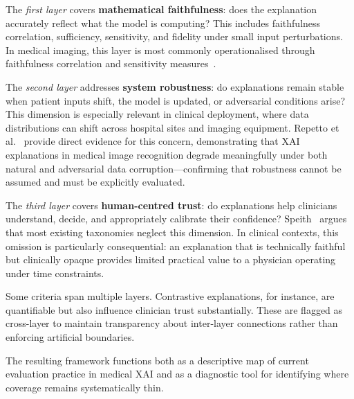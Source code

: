 The \emph{first layer} covers \textbf{mathematical faithfulness}: does
the explanation accurately reflect what the model is computing? This includes
faithfulness correlation, sufficiency, sensitivity, and fidelity under small
input perturbations. In medical imaging, this layer is most commonly
operationalised through faithfulness correlation and sensitivity
measures~\cite{kadir2023evaluation, jin2023guidelines}.

The \emph{second layer} addresses \textbf{system robustness}: do
explanations remain stable when patient inputs shift, the model is updated, or
adversarial conditions arise? This dimension is especially relevant in
clinical deployment, where data distributions can shift across hospital
sites and imaging equipment. Repetto et al.~\cite{Repetto2025EvaluatingTR}
provide direct evidence for this concern, demonstrating that XAI explanations in
medical image recognition degrade meaningfully under both natural and
adversarial data corruption---confirming that robustness cannot be assumed
and must be explicitly evaluated.

The \emph{third layer} covers \textbf{human-centred trust}: do
explanations help clinicians understand, decide, and appropriately calibrate
their confidence? Speith~\cite{speith2022review} argues that most
existing taxonomies neglect this dimension. In clinical contexts,
this omission is particularly consequential: an explanation that is
technically faithful but clinically opaque provides limited practical value
to a physician operating under time constraints.

Some criteria span multiple layers. Contrastive explanations, for instance,
are quantifiable but also influence clinician trust substantially. These are
flagged as cross-layer to maintain transparency about inter-layer connections
rather than enforcing artificial boundaries.

The resulting framework functions both as a descriptive map of current
evaluation practice in medical XAI and as a diagnostic tool for
identifying where coverage remains systematically thin.
